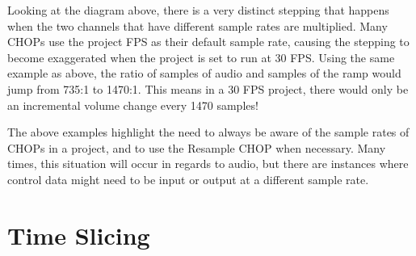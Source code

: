 \begin{fullwidth}
Looking at the diagram above, there is a very distinct stepping that happens when the two channels that have different sample rates are multiplied. Many CHOPs use the project FPS as their default sample rate, causing the stepping to become exaggerated when the project is set to run at 30 FPS. Using the same example as above, the ratio of samples of audio and samples of the ramp would jump from 735:1 to 1470:1. This means in a 30 FPS project, there would only be an incremental volume change every 1470 samples! 

The above examples highlight the need to always be aware of the sample rates of CHOPs in a project, and to use the Resample CHOP when necessary. Many times, this situation will occur in regards to audio, but there are instances where control data might need to be input or output at a different sample rate. 

\end{fullwidth}

\section{Time Slicing}

